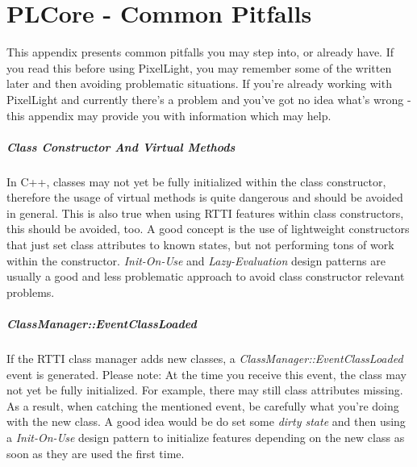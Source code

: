 \chapter{PLCore - Common Pitfalls}
\label{Appendix:CommonPitfalls}
This appendix presents common pitfalls you may step into, or already have. If you read this before using PixelLight, you may remember some of the written later and then avoiding problematic situations. If you're already working with PixelLight and currently there's a problem and you've got no idea what's wrong - this appendix may provide you with information which may help.


\paragraph{Class Constructor And Virtual Methods}
In C++, classes may not yet be fully initialized within the class constructor, therefore the usage of virtual methods is quite dangerous and should be avoided in general. This is also true when using RTTI features within class constructors, this should be avoided, too. A good concept is the use of lightweight constructors that just set class attributes to known states, but not performing tons of work within the constructor. \emph{Init-On-Use} and \emph{Lazy-Evaluation} design patterns are usually a good and less problematic approach to avoid class constructor relevant problems.


\paragraph{ClassManager::EventClassLoaded}
If the RTTI class manager adds new classes, a \emph{ClassManager::EventClassLoaded} event is generated. Please note: At the time you receive this event, the class may not yet be fully initialized. For example, there may still class attributes missing. As a result, when catching the mentioned event, be carefully what you're doing with the new class. A good idea would be do set some \emph{dirty state} and then using a \emph{Init-On-Use} design pattern to initialize features depending on the new class as soon as they are used the first time.


